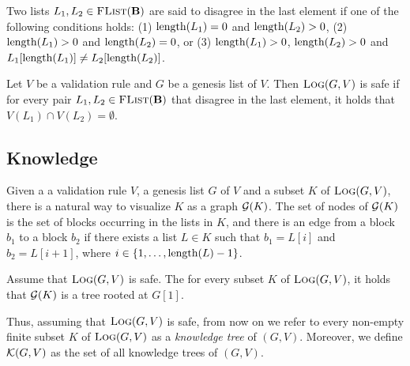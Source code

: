 %
%

Two lists $L_1, L_2 \in \text{\sc FList}(\text{\bf B})$ are said to disagree in the last element if one of the following conditions holds: (1) $\text{\rm length}(L_1) = 0$ and $\text{\rm length}(L_2) > 0$, (2) $\text{\rm length}(L_1) > 0$ and $\text{\rm length}(L_2) = 0$, or (3) $\text{\rm length}(L_1) > 0$, $\text{\rm length}(L_2) > 0$ and $L_1[\text{\rm length}(L_1)] \neq L_2[\text{\rm length}(L_2)]$.
\begin{mydef}
Let $V$ be a validation rule and $G$ be a genesis list of $V$. Then $\text{\sc Log}(G,V)$ is safe if for every pair $L_1, L_2 \in \text{\sc FList}(\text{\bf B})$ that disagree in the last element, it holds that $V(L_1) \cap V(L_2) = \emptyset$.
\end{mydef}


\subsection{Knowledge}

Given a  a validation rule $V$, a genesis list $G$ of $V$ and a subset $K$ of $\text{\sc Log}(G,V)$, there is a natural way to  visualize  $K$ as a graph $\mathcal{G}(K)$. The set of nodes of $\mathcal{G}(K)$ is the set of blocks occurring in the lists in $K$, and there is an edge from a block $b_1$ to a block $b_2$ if there exists a list $L \in K$ such that $b_1 = L[i]$ and $b_2 = L[i+1]$, where $i \in \{1, \ldots, \text{\rm length}(L) -1\}$.
\begin{mylem}
Assume that $\text{\sc Log}(G,V)$ is safe. The for every subset $K$ of $\text{\sc Log}(G,V)$, it holds that $\mathcal{G}(K)$ is a tree rooted at $G[1]$.
\end{mylem}
Thus, assuming that $\text{\sc Log}(G,V)$ is safe, from now on we refer to every non-empty finite subset $K$ of $\text{\sc Log}(G,V)$ as a {\em knowledge tree} of $(G,V)$. Moreover, we define $\mathcal{K}(G,V)$ as the set of all knowledge trees of $(G,V)$.

